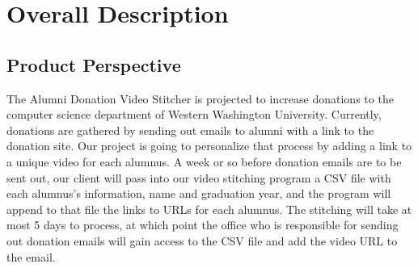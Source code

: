 \section{Overall Description}
%

\subsection{Product Perspective}
The Alumni Donation Video Stitcher is projected to increase donations to the 
computer science department of Western Washington University. Currently, 
donations are gathered by sending out emails to alumni with a link to the 
donation site. Our project is going to personalize that process by adding a 
link to a unique video for each alumnus. A week or so before donation emails 
are to be sent out, our client will pass into our video stitching program a 
CSV file with each alumnus's information, name and graduation year, and the 
program will append to that file the links to URLs for each alumnus. The 
stitching will take at most 5 days to process, at which point the office 
who is responsible for sending out donation emails will gain access to the 
CSV file and add the video URL to the email.


